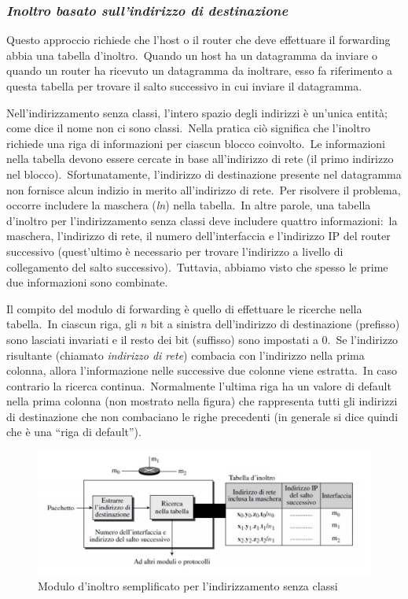 \subsubsection{\emph{Inoltro basato sull'indirizzo di destinazione}}

Questo approccio richiede che l'host o il router che deve effettuare il forwarding abbia una tabella d'inoltro.\
Quando un host ha un datagramma da inviare o quando un router ha ricevuto un datagramma da inoltrare, esso fa riferimento a questa tabella per trovare il salto successivo in cui inviare il datagramma.

Nell'indirizzamento senza classi, l'intero spazio degli indirizzi è un'unica entità; come dice il nome non ci sono classi.\
Nella pratica ciò significa che l'inoltro richiede una riga di informazioni per ciascun blocco coinvolto.\
Le informazioni nella tabella devono essere cercate in base all'indirizzo di rete (il primo indirizzo nel blocco).\
Sfortunatamente, l'indirizzo di destinazione presente nel datagramma non fornisce alcun indizio in merito all'indirizzo di rete.\
Per risolvere il problema, occorre includere la maschera (\emph{ln}) nella tabella.\
In altre parole, una tabella d'inoltro per l'indirizzamento senza classi deve includere quattro informazioni:\ la maschera, l'indirizzo di rete, il numero dell'interfaccia e l'indirizzo IP del router successivo (quest'ultimo è necessario per trovare l'indirizzo a livello di collegamento del salto successivo).\
Tuttavia, abbiamo visto che spesso le prime due informazioni sono combinate.

Il compito del modulo di forwarding è quello di effettuare le ricerche nella tabella.\
In ciascun riga, gli \emph{n} bit a sinistra dell'indirizzo di destinazione (prefisso) sono lasciati invariati e il resto dei bit (suffisso) sono impostati a 0.\
Se l'indirizzo risultante (chiamato \emph{indirizzo di rete}) combacia con l'indirizzo nella prima colonna, allora l'informazione nelle successive due colonne viene estratta.\
In caso contrario la ricerca continua.\
Normalmente l'ultima riga ha un valore di default nella prima colonna (non mostrato nella figura) che rappresenta tutti gli indirizzi di destinazione che non combaciano le righe precedenti (in generale si dice quindi che è una ``riga di default'').
\begin{figure}[H]
    \centering
    \includegraphics[width=\textwidth]{immagini/Modulo_inoltro.jpg}
    \caption*{Modulo d'inoltro semplificato per l'indirizzamento senza classi}
\end{figure}

